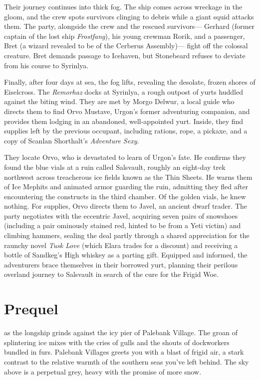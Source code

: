 \documentclass[
  letterpaper,12pt,twoside,twocolumn,openany,
  nodeprecatedcode,bg=full]{dndbook}
\begin{document}
Their journey continues into thick fog. The ship comes across wreckage
in the gloom, and the crew spots survivors clinging to debris while a
giant squid attacks them. The party, alongside the crew and the rescued
survivors--- Gerhard (former captain of the lost ship \emph{Frostfang}),
his young crewman Rorik, and a passenger, Bret (a wizard revealed to be
of the Cerberus Assembly)--- fight off the colossal creature. Bret
demands passage to Icehaven, but Stonebeard refuses to deviate from his
course to Syrinlya.

Finally, after four days at sea, the fog lifts, revealing the desolate,
frozen shores of Eiselcross. The \emph{Remorhaz} docks at Syrinlya, a
rough outpost of yurts huddled against the biting wind. They are met by
Morgo Delwur, a local guide who directs them to find Orvo Mustave,
Urgon's former adventuring companion, and provides them lodging in an
abandoned, well-appointed yurt. Inside, they find supplies left by the
previous occupant, including rations, rope, a pickaxe, and a copy of
Scanlan Shorthalt's \emph{Adventure Sexy}.

They locate Orvo, who is devastated to learn of Urgon's fate. He
confirms they found the blue vials at a ruin called Salsvault, roughly
an eight-day trek northwest across treacherous ice fields known as the
Thin Sheets. He warns them of Ice Mephits and animated armor guarding
the ruin, admitting they fled after encountering the constructs in the
third chamber. Of the golden vials, he knew nothing. For supplies, Orvo
directs them to Javel, an ancient dwarf trader. The party negotiates
with the eccentric Javel, acquiring seven pairs of snowshoes (including
a pair ominously stained red, hinted to be from a Yeti victim) and
climbing hammers, sealing the deal partly through a shared appreciation
for the raunchy novel \emph{Tusk Love} (which Elara trades for a
discount) and receiving a bottle of Sandkeg's High whiskey as a parting
gift. Equipped and informed, the adventurers brace themselves in their
borrowed yurt, planning their perilous overland journey to Salsvault in
search of the cure for the Frigid Woe.

\chapter{Prequel}\label{prequel}

 as the longship
grinds against the icy pier of Palebank Village. The groan of
splintering ice mixes with the cries of gulls and the shouts of
dockworkers bundled in furs. Palebank Villages greets you with a blast
of frigid air, a stark contrast to the relative warmth of the southern
seas you've left behind. The sky above is a perpetual grey, heavy with
the promise of more snow.
\end{document}

